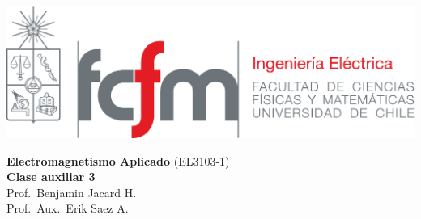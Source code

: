 \documentclass[
  11pt,
  letterpaper,
   addpoints,
   answers
  ]{exam}
\begin{document}
\noindent
\begin{minipage}{0.47\textwidth}
\includegraphics[width=\textwidth]{../fcfm_die}
\end{minipage}
\begin{minipage}{0.53\textwidth}
\begin{center} 
\large\textbf{Electromagnetismo Aplicado} (EL3103-1) \\
\large\textbf{Clase auxiliar 3} \\
\normalsize Prof.~Benjamin Jacard H.\\
\normalsize Prof.~Aux.~Erik Saez A.
\end{center}
\end{minipage}

\vspace{0.5cm}
\noindent
\vspace{.85cm}
\end{document}
